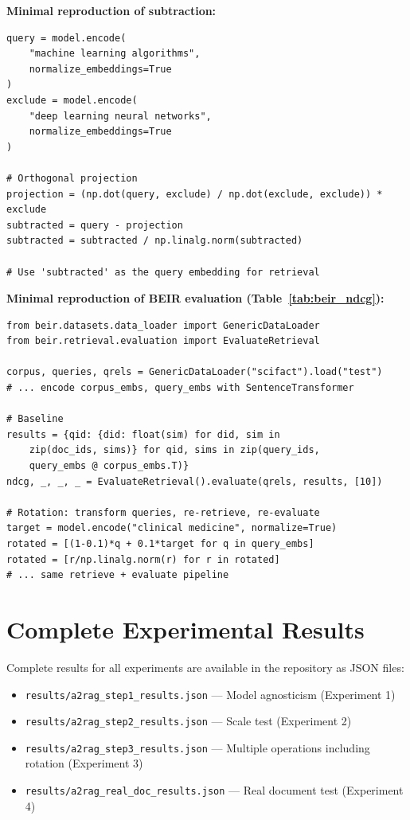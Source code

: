 \documentclass{article}
\begin{document}
\textbf{Minimal reproduction of subtraction:}

\begin{Verbatim}[fontsize=\small]
query = model.encode(
    "machine learning algorithms",
    normalize_embeddings=True
)
exclude = model.encode(
    "deep learning neural networks",
    normalize_embeddings=True
)

# Orthogonal projection
projection = (np.dot(query, exclude) / np.dot(exclude, exclude)) * exclude
subtracted = query - projection
subtracted = subtracted / np.linalg.norm(subtracted)

# Use 'subtracted' as the query embedding for retrieval
\end{Verbatim}

\textbf{Minimal reproduction of BEIR evaluation (Table~\ref{tab:beir_ndcg}):}

\begin{Verbatim}[fontsize=\small]
from beir.datasets.data_loader import GenericDataLoader
from beir.retrieval.evaluation import EvaluateRetrieval

corpus, queries, qrels = GenericDataLoader("scifact").load("test")
# ... encode corpus_embs, query_embs with SentenceTransformer

# Baseline
results = {qid: {did: float(sim) for did, sim in
    zip(doc_ids, sims)} for qid, sims in zip(query_ids,
    query_embs @ corpus_embs.T)}
ndcg, _, _, _ = EvaluateRetrieval().evaluate(qrels, results, [10])

# Rotation: transform queries, re-retrieve, re-evaluate
target = model.encode("clinical medicine", normalize=True)
rotated = [(1-0.1)*q + 0.1*target for q in query_embs]
rotated = [r/np.linalg.norm(r) for r in rotated]
# ... same retrieve + evaluate pipeline
\end{Verbatim}

\section{Complete Experimental Results}

Complete results for all experiments are available in the repository as JSON files:

\begin{itemize}
\item \texttt{results/a2rag\_step1\_results.json} --- Model agnosticism (Experiment 1)
\item \texttt{results/a2rag\_step2\_results.json} --- Scale test (Experiment 2)
\item \texttt{results/a2rag\_step3\_results.json} --- Multiple operations including rotation (Experiment 3)
\item \texttt{results/a2rag\_real\_doc\_results.json} --- Real document test (Experiment 4)
\end{itemize}
\end{document}
